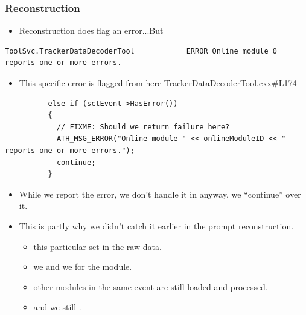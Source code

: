 \begin{frame}[fragile]
    \frametitle{Reconstruction}

    \begin{itemize}
        \item Reconstruction does flag an error...But
    \end{itemize}
    \scriptsize{
        \begin{verbatim}
ToolSvc.TrackerDataDecoderTool            ERROR Online module 0 reports one or more errors.
        \end{verbatim}
    }
    \begin{itemize}
        \item This specific error is flagged from here \href{https://gitlab.cern.ch/faser/calypso/-/blob/master/Tracker/TrackerEventCnv/TrackerByteStream/src/TrackerDataDecoderTool.cxx#L174}{TrackerDataDecoderTool.cxx\#L174}
    \end{itemize}

    \scriptsize{
        \begin{verbatim}
          else if (sctEvent->HasError())
          {
            // FIXME: Should we return failure here?
            ATH_MSG_ERROR("Online module " << onlineModuleID << " reports one or more errors.");
            continue;
          }
        \end{verbatim}
    }

    \begin{itemize}
        \item While we report the error, we don't handle it in anyway, we ``continue'' over it.
        \item This is partly why we didn't catch it earlier in the prompt reconstruction.
              \begin{itemize}
                  \item this particular  set in the raw data.
                  \item we  and we  for the module.
                  \item other modules in the same event are still loaded and processed.
                  \item and we still .
              \end{itemize}
    \end{itemize}


\end{frame}


